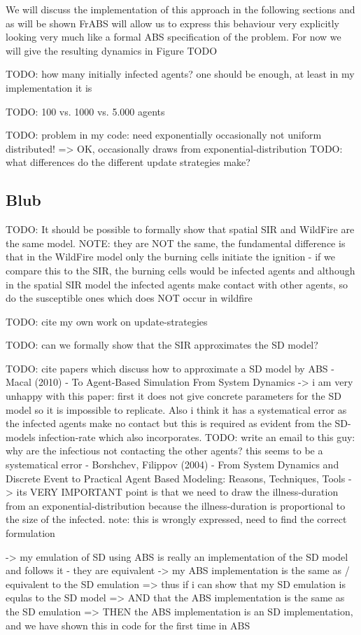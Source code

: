 We will discuss the implementation of this approach in the following sections and as will be shown FrABS will allow us to express this behaviour very explicitly looking very much like a formal ABS specification of the problem. For now we will give the resulting dynamics in Figure TODO

TODO: how many initially infected agents? one should be enough, at least in my implementation it is

TODO: 100 vs. 1000 vs. 5.000 agents

TODO: problem in my code: need exponentially occasionally not uniform distributed! => OK, occasionally draws from exponential-distribution
TODO: what differences do the different update strategies make?

\subsection{Blub}
TODO: It should be possible to formally show that spatial SIR and WildFire are the same model. NOTE: they are NOT the same, the fundamental difference is that in the WildFire model only the burning cells initiate the ignition - if we compare this to the SIR, the burning cells would be infected agents and although in the spatial SIR model the infected agents make contact with other agents, so do the susceptible ones which does NOT occur in wildfire

TODO: cite my own work on update-strategies

TODO: can we formally show that the SIR approximates the SD model?

TODO: cite papers which discuss how to approximate a SD model by ABS
- Macal (2010) - To Agent-Based Simulation From System Dynamics 
	-> i am very unhappy with this paper: first it does not give concrete parameters for the SD model so it is impossible to replicate. Also i think it has a systematical error as the infected agents make no contact but this is required as evident from the SD-models infection-rate which also incorporates. TODO: write an email to this guy: why are the infectious not contacting the other agents? this seems to be a systematical error
- Borshchev, Filippov (2004) - From System Dynamics and Discrete Event to Practical Agent Based Modeling: Reasons, Techniques, Tools
	-> its VERY IMPORTANT point is that we need to draw the illness-duration from an exponential-distribution because the illness-duration is proportional to the size of the infected. note: this is wrongly expressed, need to find the correct formulation

		-> my emulation of SD using ABS is really an implementation of the SD model and follows it - they are equivalent
		-> my ABS implementation is the same as / equivalent to the SD emulation
			=> thus if i can show that my SD emulation is equlas to the SD model
			=> AND that the ABS implementation is the same as the SD emulation
			=> THEN the ABS implementation is an SD implementation, and we have shown this in code for the first time in ABS
			
